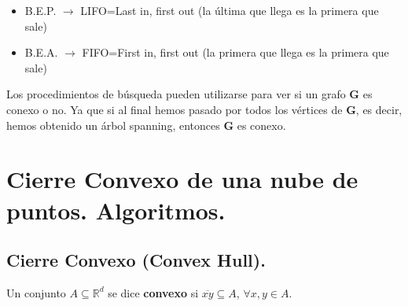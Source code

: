 \documentclass[twoside]{report}
\newcommand{\bs}[1]{\boldsymbol{#1}}
\begin{document}
        \begin{itemize}
            \item B.E.P. $\rightarrow$ LIFO=Last in, first out (la última que llega es la primera que sale)
            \item B.E.A. $\rightarrow$ FIFO=First in, first out (la primera que llega es la primera que sale)
        \end{itemize}

\vspace{0.2cm}
Los procedimientos de búsqueda pueden u\-ti\-li\-zar\-se para ver si un grafo $\bs{G}$ es conexo o no. Ya que si al final hemos pasado por todos
los vértices de $\bs{G}$, es decir, hemos obtenido un árbol spanning, entonces $\bs{G}$ es conexo.

%
%
%

\newpage

\section{Cierre Convexo de una nube de puntos. Algoritmos.}

\subsection{Cierre Convexo (Convex Hull).}

\begin{defi} Un conjunto $A \subseteq \mathbb{R}^d$ se dice
\textbf{convexo} si $\overline{xy} \subseteq A$, $\forall x,y \in A$.
\end{defi}
\end{document}

